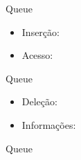 \begin{frame}[fragile]{Queue}

    \begin{itemize}
        \item Inserção:
        \item Acesso:
    \end{itemize}

\end{frame}

\begin{frame}[fragile]{Queue}

    \begin{itemize}
        \item Deleção:
        \item Informações:
    \end{itemize}

\end{frame}

\begin{frame}[fragile]{Queue}


\end{frame}
